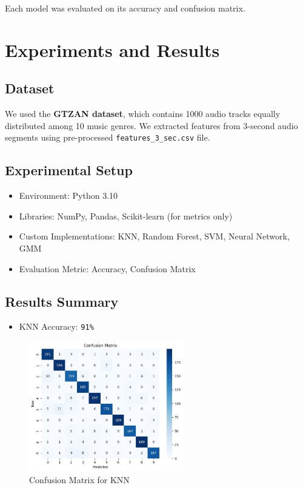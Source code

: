 \documentclass[a4paper]{article}
\theoremstyle{plain}
\theoremstyle{definition}
\begin{document}
Each model was evaluated on its accuracy and confusion matrix.

\section{Experiments and Results}
\label{sec:results}

\subsection{Dataset}
We used the \textbf{GTZAN dataset}, which contains 1000 audio tracks equally distributed among 10 music genres. We extracted features from 3-second audio segments using pre-processed \texttt{features\_3\_sec.csv} file.

\subsection{Experimental Setup}
\begin{itemize}
    \item Environment: Python 3.10
    \item Libraries: NumPy, Pandas, Scikit-learn (for metrics only)
    \item Custom Implementations: KNN, Random Forest, SVM, Neural Network, GMM
    \item Evaluation Metric: Accuracy, Confusion Matrix
\end{itemize}

\subsection{Results Summary}

\begin{itemize}
    \item KNN Accuracy: \texttt{91\%}
\end{itemize}
\begin{figure}[H]
    \centering
    \includegraphics[width=0.6\textwidth]{knn_cm.png}
    \caption{Confusion Matrix for KNN}
\end{figure}
\end{document}
